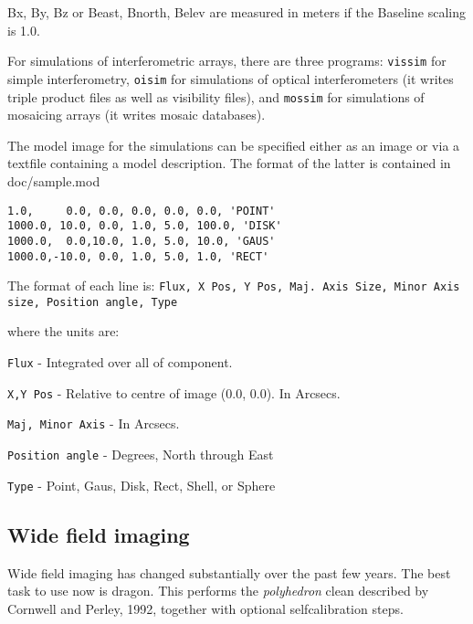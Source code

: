 Bx, By, Bz or Beast, Bnorth, Belev are measured in meters if
the Baseline scaling is 1.0.

For simulations of interferometric arrays, there are three programs:
{\tt vissim} for simple interferometry, {\tt oisim} for simulations of
optical interferometers (it writes triple product files as well as
visibility files), and {\tt mossim} for simulations of mosaicing
arrays (it writes mosaic databases).

The model image for the simulations can be specified either as
an image or via a textfile containing a model description. The format
of the latter is contained in doc/sample.mod

\begin{verbatim}
1.0,     0.0, 0.0, 0.0, 0.0, 0.0, 'POINT'
1000.0, 10.0, 0.0, 1.0, 5.0, 100.0, 'DISK'
1000.0,  0.0,10.0, 1.0, 5.0, 10.0, 'GAUS'
1000.0,-10.0, 0.0, 1.0, 5.0, 1.0, 'RECT'
\end{verbatim}

The format of each line is:
{\tt Flux, X Pos, Y Pos, Maj. Axis Size, Minor Axis size, Position angle, 
Type}

where the units are:

{\tt Flux} - Integrated over all of component.

{\tt X,Y Pos} - Relative to centre of image (0.0, 0.0). In Arcsecs.

{\tt Maj, Minor Axis} - In Arcsecs.

{\tt Position angle} - Degrees, North through East

{\tt Type} - Point, Gaus, Disk, Rect, Shell, or Sphere

%

\subsection{Wide field imaging}

Wide field imaging has changed substantially over the past few years.
The best task to use now is dragon. This performs the {\em polyhedron}
clean described by Cornwell and Perley, 1992, together with optional
selfcalibration steps.

